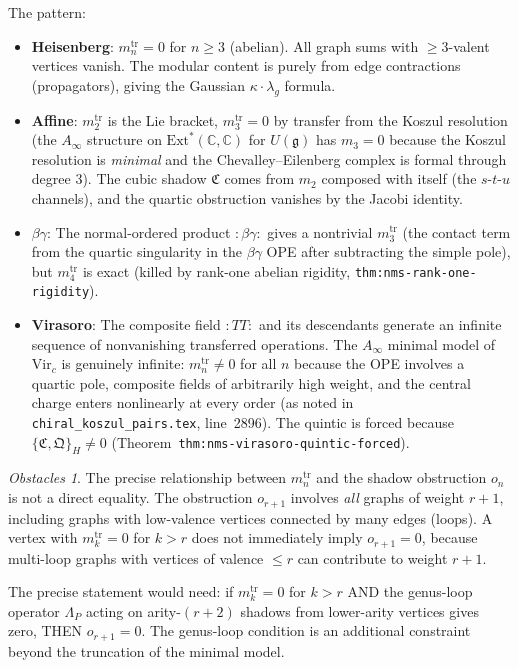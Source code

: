 \documentclass[11pt]{article}
\theoremstyle{definition}
\theoremstyle{remark}
\newtheorem*{obstacle}{Obstacles}
\newcommand{\Vir}{\mathrm{Vir}}
\begin{document}
The pattern:
\begin{itemize}
\item \textbf{Heisenberg}: $m_n^{\mathrm{tr}} = 0$ for $n \geq 3$
(abelian).  All graph sums with $\geq 3$-valent vertices vanish.
The modular content is purely from edge contractions (propagators),
giving the Gaussian $\kappa \cdot \lambda_g$ formula.

\item \textbf{Affine}: $m_2^{\mathrm{tr}}$ is the Lie bracket,
$m_3^{\mathrm{tr}} = 0$ by transfer from the Koszul resolution (the
$A_\infty$ structure on $\mathrm{Ext}^*(\mathbb{C}, \mathbb{C})$
for $U(\mathfrak{g})$ has $m_3 = 0$ because the Koszul resolution
is \emph{minimal} and the Chevalley--Eilenberg complex is formal
through degree 3).  The cubic shadow $\mathfrak{C}$ comes from
$m_2$ composed with itself (the $s$-$t$-$u$ channels), and the
quartic obstruction vanishes by the Jacobi identity.

\item \textbf{$\beta\gamma$}: The normal-ordered product
$:\beta\gamma:$ gives a nontrivial $m_3^{\mathrm{tr}}$ (the contact
term from the quartic singularity in the $\beta\gamma$ OPE after
subtracting the simple pole), but $m_4^{\mathrm{tr}}$ is exact
(killed by rank-one abelian rigidity,
\texttt{thm:nms-rank-one-rigidity}).

\item \textbf{Virasoro}: The composite field $:TT:$ and its
descendants generate an infinite sequence of nonvanishing
transferred operations.  The $A_\infty$ minimal model of $\Vir_c$
is genuinely infinite: $m_n^{\mathrm{tr}} \neq 0$ for all $n$
because the OPE involves a quartic pole, composite fields of
arbitrarily high weight, and the central charge enters nonlinearly
at every order (as noted in
\texttt{chiral\_koszul\_pairs.tex}, line~2896).  The quintic is
forced because $\{\mathfrak{C}, \mathfrak{Q}\}_H \neq 0$
(Theorem~\texttt{thm:nms-virasoro-quintic-forced}).
\end{itemize}

\begin{obstacle}
The precise relationship between $m_n^{\mathrm{tr}}$ and the shadow
obstruction $o_n$ is not a direct equality.  The obstruction
$o_{r+1}$ involves \emph{all} graphs of weight $r+1$, including
graphs with low-valence vertices connected by many edges (loops).
A vertex with $m_k^{\mathrm{tr}} = 0$ for $k > r$ does not
immediately imply $o_{r+1} = 0$, because multi-loop graphs with
vertices of valence $\leq r$ can contribute to weight $r+1$.

The precise statement would need: if $m_k^{\mathrm{tr}} = 0$ for
$k > r$ AND the genus-loop operator $\Lambda_P$ acting on
arity-$(r+2)$ shadows from lower-arity vertices gives zero, THEN
$o_{r+1} = 0$.  The genus-loop condition is an additional
constraint beyond the truncation of the minimal model.
\end{obstacle}
\end{document}
